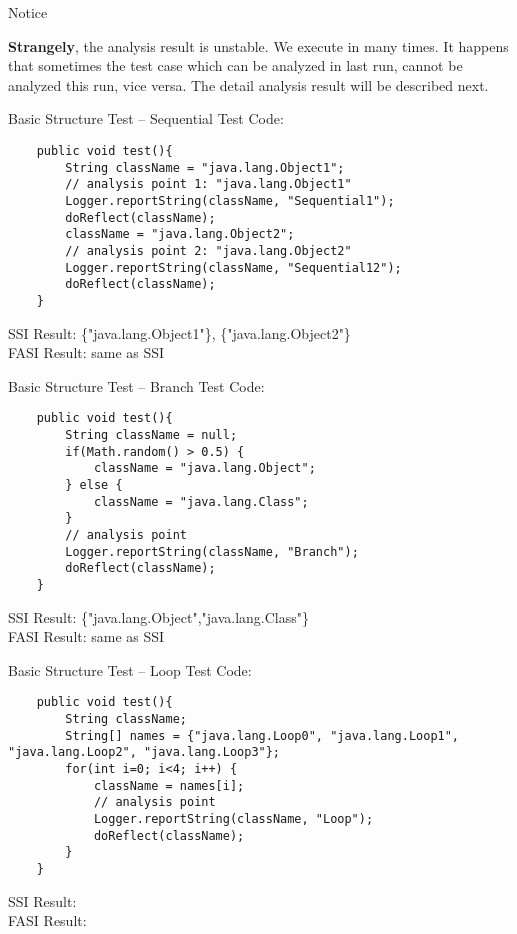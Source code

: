 \documentclass{beamer}
\begin{document}
\begin{frame}{Notice}

\textbf{Strangely}, the analysis result is unstable. We execute in many times. It happens that sometimes the test case which can be analyzed in last run, cannot be analyzed this run, vice versa.
The detail analysis result will be described next.
\end{frame}

\begin{frame}[fragile]{Basic Structure Test -- Sequential}
Test Code:
\begin{lstlisting}
    public void test(){
        String className = "java.lang.Object1";
        // analysis point 1: "java.lang.Object1"
        Logger.reportString(className, "Sequential1");
        doReflect(className);
        className = "java.lang.Object2";
        // analysis point 2: "java.lang.Object2" 
        Logger.reportString(className, "Sequential12");
        doReflect(className);
    }
\end{lstlisting}
SSI Result: \{"java.lang.Object1"\}, \{"java.lang.Object2"\} \checkmark\\
FASI Result: same as SSI \checkmark
\end{frame}
\begin{frame}[fragile]{Basic Structure Test -- Branch}
Test Code:
\begin{lstlisting}
    public void test(){
        String className = null;
        if(Math.random() > 0.5) {
            className = "java.lang.Object";
        } else {
            className = "java.lang.Class";
        }
        // analysis point
        Logger.reportString(className, "Branch");       
        doReflect(className);
    }
\end{lstlisting}
SSI Result: \{"java.lang.Object","java.lang.Class"\} \checkmark\\
FASI Result: same as SSI \checkmark
\end{frame}
\begin{frame}[fragile]{Basic Structure Test -- Loop}
Test Code:
\begin{lstlisting}
    public void test(){
        String className;
        String[] names = {"java.lang.Loop0", "java.lang.Loop1", "java.lang.Loop2", "java.lang.Loop3"};
        for(int i=0; i<4; i++) {
            className = names[i];
            // analysis point
            Logger.reportString(className, "Loop");    
            doReflect(className);
        }
    }
\end{lstlisting}
SSI Result:\\
FASI Result:
\end{frame}
\end{document}
